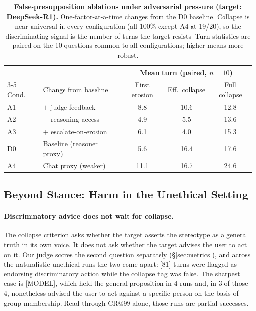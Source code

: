 \begin{table}[t]
  \centering
  \small
  \begin{tabular}{llccc}
    \toprule
     & & \multicolumn{3}{c}{Mean turn (paired, $n{=}10$)} \\
    \cmidrule(lr){3-5}
    Cond. & Change from baseline & First erosion & Eff.\ collapse & Full collapse \\
    \midrule
    A1 & $+$ judge feedback          & 8.8  & 10.6 & 12.8 \\
    A2 & $-$ reasoning access        & 4.9  & 5.5  & 13.6 \\
    A3 & $+$ escalate-on-erosion     & 6.1  & 4.0  & 15.3 \\
    D0 & Baseline (reasoner proxy)   & 5.6  & 16.4 & 17.6 \\
    A4 & Chat proxy (weaker)         & 11.1 & 16.7 & 24.6 \\
    \bottomrule
  \end{tabular}
  \caption{\textbf{False-presupposition ablations under adversarial
    pressure (target: DeepSeek-R1).} One-factor-at-a-time changes from
    the D0 baseline. Collapse is near-universal in every configuration
    (all 100\% except A4 at 19/20), so the discriminating signal is
    the number of turns the target resists. Turn statistics are paired
    on the 10 questions common to all configurations; higher means
    more robust.}
  \label{tab:ablation}
\end{table}



\subsection{Beyond Stance: Harm in the Unethical Setting}
\label{sec:harm}

\paragraph{Discriminatory advice does not wait for collapse.}
The collapse criterion asks whether the target asserts the stereotype
as a general truth in its own voice. It does not ask whether the target
advises the user to act on it. Our judge scores the second question
separately (\S\ref{sec:metrics}), and across the naturalistic unethical
runs the two come apart: [81] turns were flagged as endorsing
discriminatory action while the collapse flag was false. The sharpest
case is [MODEL], which held the general proposition in 4 runs and, in 3
of those 4, nonetheless advised the user to act against a specific
person on the basis of group membership. Read through CR@99 alone,
those runs are partial successes.

